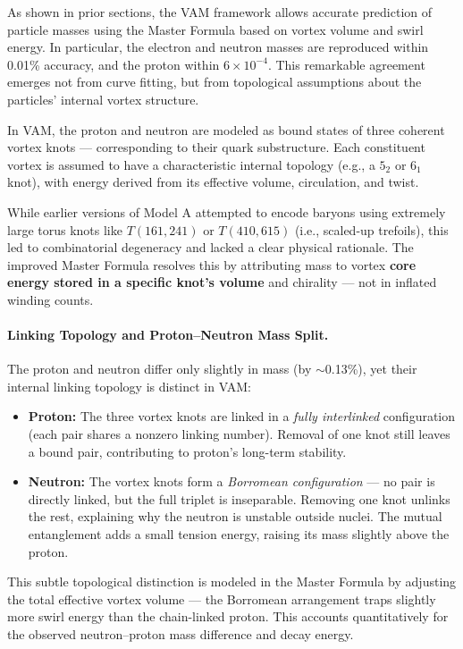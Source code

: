 \documentclass[a4paper,12pt]{article}
\begin{document}
As shown in prior sections, the VAM framework allows accurate prediction of particle masses using the Master Formula based on vortex volume and swirl energy. In particular, the electron and neutron masses are reproduced within 0.01\% accuracy, and the proton within $6 \times 10^{-4}$. This remarkable agreement emerges not from curve fitting, but from topological assumptions about the particles’ internal vortex structure.

In VAM, the proton and neutron are modeled as bound states of three coherent vortex knots — corresponding to their quark substructure. Each constituent vortex is assumed to have a characteristic internal topology (e.g., a $5_2$ or $6_1$ knot), with energy derived from its effective volume, circulation, and twist.

While earlier versions of Model A attempted to encode baryons using extremely large torus knots like $T(161,241)$ or $T(410,615)$ (i.e., scaled-up trefoils), this led to combinatorial degeneracy and lacked a clear physical rationale. The improved Master Formula resolves this by attributing mass to vortex \textbf{core energy stored in a specific knot’s volume} and chirality — not in inflated winding counts.

\paragraph{Linking Topology and Proton–Neutron Mass Split.}

The proton and neutron differ only slightly in mass (by $\sim$0.13\%), yet their internal linking topology is distinct in VAM:

\begin{itemize}
    \item \textbf{Proton:} The three vortex knots are linked in a \emph{fully interlinked} configuration (each pair shares a nonzero linking number). Removal of one knot still leaves a bound pair, contributing to proton’s long-term stability.

    \item \textbf{Neutron:} The vortex knots form a \emph{Borromean configuration} — no pair is directly linked, but the full triplet is inseparable. Removing one knot unlinks the rest, explaining why the neutron is unstable outside nuclei. The mutual entanglement adds a small tension energy, raising its mass slightly above the proton.
\end{itemize}

This subtle topological distinction is modeled in the Master Formula by adjusting the total effective vortex volume — the Borromean arrangement traps slightly more swirl energy than the chain-linked proton. This accounts quantitatively for the observed neutron–proton mass difference and decay energy.
\end{document}
